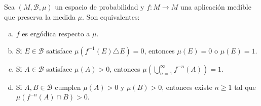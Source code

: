 \begin{teorema}
	Sea $(M, \mathcal{B}, \mu)$ un espacio de probabilidad y $f: M \to M$ una aplicación medible que preserva la medida $\mu$. Son equivalentes:
	\begin{enumerate}[a)]
		\item $f$ es ergódica respecto a $\mu$.
		\item Si $E \in \mathcal{B}$ satisface $\mu(f^{-1}(E) \triangle E) = 0$, entonces $\mu(E) = 0$ o $\mu(E) = 1$.
		\item Si $A \in \mathcal{B}$ satisface $\mu(A) > 0$, entonces $\mu \left( \bigcup_{n=1}^\infty f^{-n}(A) \right) = 1$.
		\item Si $A, B \in \mathcal{B}$ cumplen $\mu(A) > 0$ y $\mu(B) > 0$, entonces existe $n \ge 1$ tal que $\mu(f^{-n}(A) \cap B) > 0$.
	\end{enumerate}
\end{teorema}
